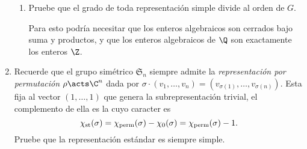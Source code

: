 \documentclass[11pt, reqno]{amsart}
\begin{document}
\begin{enumerate}
\begin{enumerate}
			\item
				Pruebe que el grado de toda representación simple divide al orden de $G$.
				\begin{hint}
					Para esto podría necesitar que los enteros algebraicos son cerrados bajo suma y productos, y que los
					enteros algebraicos de $\Q$ son exactamente los enteros $\Z$.
				\end{hint}
		\end{enumerate}
		\nocite{huppert:finite_i}

		\newex
	\item\lookright Recuerde que el grupo simétrico $\mathfrak{S}_n$ siempre admite la \emph{representación por permutación} $\rho \acts
		\C^n$ dada por $\sigma \cdot (v_1, \dots, v_n) = (v_{\sigma(1)}, \dots, v_{\sigma(n)})$.
		Esta fija al vector $(1, \dots, 1)$ que genera la subrepresentación trivial, el complemento de ella es la
		 cuyo caracter es
		\[
			\chi_{\rm st}(\sigma) = \chi_{\rm perm}(\sigma) - \chi_0(\sigma) = \chi_{\rm perm}(\sigma) - 1.
		\]
		Pruebe que la representación estándar es siempre simple.
\end{enumerate}

\begin{additional}
\printbibliography
\end{additional}
\end{document}
